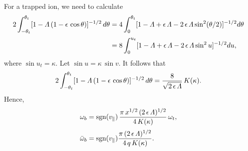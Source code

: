 \documentclass[12pt,prb,aps,notitlepage]{revtex4-1}
\begin{document}
For a trapped ion, we need to calculate 
\begin{align}
2\int_{-\theta_t}^{\theta_t} [1-{\mit\Lambda}\,(1-\epsilon\,\cos\theta)]^{-1/2}\,d\theta &=4\int_0^{\theta_t}[1-{\mit\Lambda}+\epsilon\,{\mit\Lambda} - 2\,\epsilon\,{\mit\Lambda}\sin^2(\theta/2)]^{-1/2}d\theta\nonumber\\[0.5ex]
&=8\int_0^{u_t}[1-{\mit\Lambda}+\epsilon\,{\mit\Lambda} - 2\,\epsilon\,{\mit\Lambda}\sin^2 u]^{-1/2}du,
\end{align}
where
$\sin u_t =\kappa$. 
Let
$\sin u = \kappa\,\sin v$.
It follows that 
\begin{equation}
2\int_{-\theta_t}^{\theta_t} [1-{\mit\Lambda}\,(1-\epsilon\,\cos\theta)]^{-1/2}\,d\theta= \frac{8}{\sqrt{2\,\epsilon\,{\mit\Lambda}}}\,K(\kappa).
\end{equation}
Hence,
\begin{align}
\omega_b &={\rm sgn}(v_\parallel)\, \frac{\pi\,x^{1/2}\,(2\,\epsilon\,{\mit\Lambda})^{1/2}}{4\,K(\kappa)}\,\omega_t,\\[0.5ex]
\bar{\omega}_b &={\rm sgn}(v_\parallel)\frac{\pi\,(2\,\epsilon\,{\mit\Lambda})^{1/2}}{4\,q\,K(\kappa)}.
\end{align}
\end{document}
